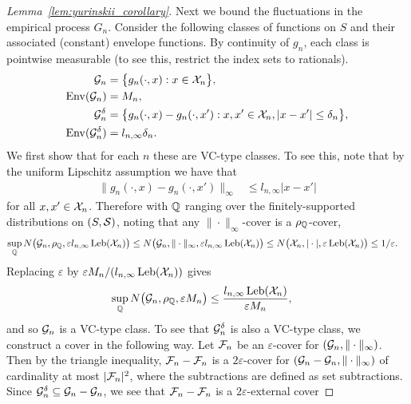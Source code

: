 \begin{proof}[Lemma~\ref{lem:yurinskii_corollary}]
  Next we bound the fluctuations in
  the empirical process $G_n$.
  Consider the following classes of functions on $S$
  and their associated (constant) envelope functions.
  By continuity of $g_n$,
  each class is pointwise measurable
  (to see this, restrict the index sets to rationals).
  \begin{align*}
    \mathcal{G}_n
    &=
    \big\{
    g_n(\cdot, x):
    x \in \mathcal{X}_n
    \big\}, \\
    \operatorname{Env}(\mathcal{G}_n)
    &=
    M_n, \\
    \mathcal{G}_n^\delta
    &=
    \big\{
    g_n(\cdot, x)
    - g_n(\cdot, x'):
    x, x' \in \mathcal{X}_n,
    |x-x'| \leq \delta_n
    \big\}, \\
    \operatorname{Env}(\mathcal{G}_n^\delta)
    &=
    l_{n,\infty} \delta_n.
  \end{align*}
  We first show that
  for each $n$
  these are VC-type classes.
  To see this,
  note that by the uniform Lipschitz assumption
  we have that
  \begin{align*}
    \big\|
    g_n(\cdot, x)
    - g_n(\cdot, x')
    \big\|_\infty
    &\leq l_{n,\infty} |x-x'|
  \end{align*}
  for all $x,x' \in \mathcal{X}_n$.
  Therefore with $\mathbb{Q}$ ranging over the
  finitely-supported distributions
  on $(S, \mathcal{S})$,
  noting that any $\|\cdot\|_\infty$-cover
  is a $\rho_{\mathbb{Q}}$-cover,
  \begin{align*}
    \sup_{\mathbb{Q}}
    N\big(\mathcal{G}_n, \rho_{\mathbb{Q}}, \varepsilon l_{n,\infty} \operatorname{Leb}(\mathcal{X}_n)\big)
    &\leq
    N\big(\mathcal{G}_n, \|\cdot\|_\infty,
    \varepsilon l_{n,\infty} \operatorname{Leb}(\mathcal{X}_n)\big)
    \leq
    N\big(\mathcal{X}_n, |\cdot|, \varepsilon \operatorname{Leb}(\mathcal{X}_n)\big)
    \leq
    1/\varepsilon.
  \end{align*}
  Replacing $\varepsilon$ by
  $\varepsilon M_n/(l_{n,\infty} \operatorname{Leb}(\mathcal{X}_n))$
  gives
  \begin{align*}
    \sup_{\mathbb{Q}}
    N\big(\mathcal{G}_n, \rho_{\mathbb{Q}}, \varepsilon M_n \big)
    &\leq
    \frac{l_{n,\infty} \operatorname{Leb}(\mathcal{X}_n)}{\varepsilon M_n},
  \end{align*}
  and so $\mathcal{G}_n$
  is a VC-type class.
  To see that $\mathcal{G}_n^\delta$
  is also a VC-type class,
  we construct a cover in the following way.
  Let $\mathcal{F}_n$ be an $\varepsilon$-cover
  for $(\mathcal{G}_n, \|\cdot\|_\infty)$.
  Then by the triangle inequality,
  $\mathcal{F}_n - \mathcal{F}_n$ is a $2\varepsilon$-cover
  for $(\mathcal{G}_n - \mathcal{G}_n, \|\cdot\|_\infty)$
  of cardinality at most $|\mathcal{F}_n|^2$,
  where the subtractions are defined as set subtractions.
  Since $\mathcal{G}_n^\delta \subseteq \mathcal{G}_n - \mathcal{G}_n$,
  we see that
  $\mathcal{F}_n - \mathcal{F}_n$ is a $2\varepsilon$-external cover

\end{proof}
